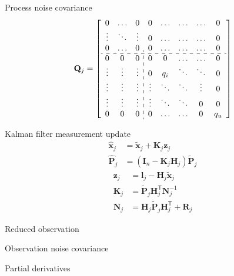 \documentclass[14pt,table,t, c]{beamer}
\begin{document}
\begin{frame}{Process noise covariance}
\begin{align*}
\mathbf{Q}_j =
\left[\begin{array}{ccc:ccccc}
0      & \ldots & 0      & 0      & \ldots     & \ldots & \ldots & 0 \\
\vdots & \ddots & \vdots & 0      & \ldots     & \ldots & \ldots & 0 \\
0      & \ldots & 0      & 0      & \ldots     & \ldots & \ldots & 0 \\ \hdashline
0      & 0      & 0      & 0      & 0          & \ldots & \ldots & 0 \\
\vdots & \vdots & \vdots & 0      & q_i & \ddots & \ddots & 0 \\
\vdots & \vdots & \vdots & \vdots & \ddots     & \ddots & \vdots & 0 \\
\vdots & \vdots & \vdots & \vdots & \ddots     & \ddots & 0      & 0 \\
0      & 0      & 0      & 0      & \ldots     & \ldots & 0      & q_u
\end{array}\right]
\end{align*}
\end{frame}

\begin{frame}{Kalman filter measurement update}
\vspace*{-2.5\baselineskip}
\begin{align*}
\hat{\mathbf{x}}_j &= \tilde{\mathbf{x}}_j + \mathbf{K}_j\mathbf{z}_j\\
\hat{\mathbf{P}}_j &= (\mathbf{I}_n - \mathbf{K}_j\mathbf{H}_j)\tilde{\mathbf{P}}_j
\end{align*}
\vspace*{-1.5\baselineskip}
\begin{align*}
\mathbf{z}_j &= \mathbf{l}_j - \mathbf{H}_j\tilde{\mathbf{x}}_j \\
\mathbf{K}_j &= \tilde{\mathbf{P}}_j\mathbf{H}_j^\mathsf{T}\mathbf{N}_j^{-1}\\
\mathbf{N}_j &= \mathbf{H}_j\tilde{\mathbf{P}}_j\mathbf{H}_j^\mathsf{T} + \mathbf{R}_j
\end{align*}
\begin{description}[$\mathbf{R}$]
\item[$\mathbf{l}$] Reduced observation
\item[$\mathbf{R}$] Observation noise covariance
\item[$\mathbf{H}$] Partial derivatives
\end{description}
\end{frame}
\end{document}
